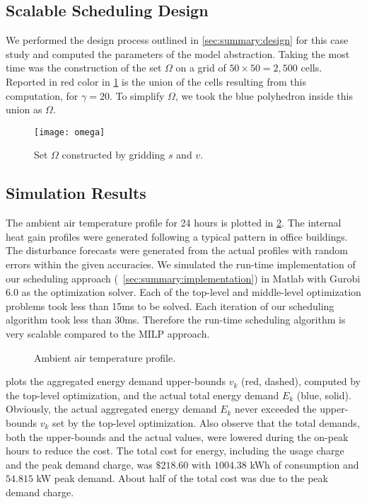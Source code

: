 \subsection{Scalable Scheduling Design}
\label{sec:simulation:design}

We performed the design process outlined in \cref{sec:summary:design} for this case study and computed the parameters of the model abstraction.
Taking the most time was the construction of the set $\Omega$ on a grid of $50 \times 50 = 2\comma 500$ cells.
Reported in red color in \cref{fig:simulation:omega} is the union of the cells resulting from this computation, for $\gamma = 20$.
To simplify $\Omega$, we took the blue polyhedron inside this union as $\Omega$.

\begin{figure}[tb]
  \centering
  \texttt{[image: omega]}
  \caption{Set $\Omega$ constructed by gridding $s$ and $v$.}
  \label{fig:simulation:omega}
\end{figure}


\subsection{Simulation Results}
\label{sec:simulation:results}

The ambient air temperature profile for 24 hours is plotted in \cref{fig:simulation:ambient}.
The internal heat gain profiles were generated following a typical pattern in office buildings.
The disturbance forecasts were generated from the actual profiles with random errors within the given accuracies.
We simulated the run-time implementation of our scheduling approach (~\cref{sec:summary:implementation}) in Matlab with Gurobi 6.0 as the optimization solver.
Each of the top-level and middle-level optimization problems took less than 15ms to be solved.
Each iteration of our scheduling algorithm took less than 30ms.
Therefore the run-time scheduling algorithm is very scalable compared to the MILP approach.

\begin{figure}[tb]
  \centering
  
  \caption{Ambient air temperature profile.}
  \label{fig:simulation:ambient}
\end{figure}

 plots the aggregated energy demand upper-bounds $v_{k}$ (red, dashed), computed by the top-level optimization, and the actual total energy demand $E_{k}$ (blue, solid).
Obviously, the actual aggregated energy demand $E_{k}$ never exceeded the upper-bounds $v_{k}$ set by the top-level optimization.
Also observe that the total demands, both the upper-bounds and the actual values, were lowered during the on-peak hours to reduce the cost.
The total cost for energy, including the usage charge and the peak demand charge, was $\$218.60$ with $1004.38$ kWh of consumption and $54.815$ kW peak demand.
About half of the total cost was due to the peak demand charge.

